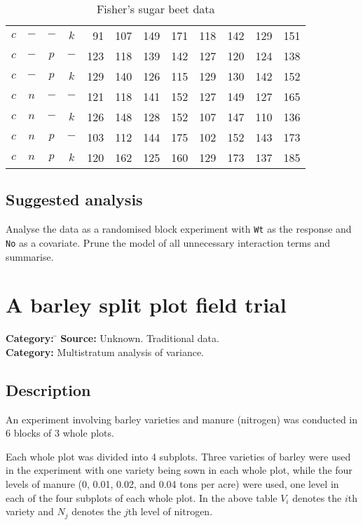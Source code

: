 \documentclass{article}
\newcommand{\strutt}{\vrule height 2.5ex depth 0.5ex width 0ex}%
\newcommand{\code}[1]{\texttt{#1}}
\begin{document}
\begin{table}[ht]
\begin{center}
\begin{tabular}{@{\protect\strutt}|cccc|*{4}{rr|}}
 $c$ &  $-$ &  $-$ &  $k$ &   91 & 107  &  149 & 171  &   118 & 142  &  129 & 151\\
 $c$ &  $-$ &  $p$ &  $-$ &  123 & 118  &  139 & 142  &   127 & 120  &  124 & 138\\
 $c$ &  $-$ &  $p$ &  $k$ &  129 & 140  &  126 & 115  &   129 & 130  &  142 & 152\\
 $c$ &  $n$ &  $-$ &  $-$ &  121 & 118  &  141 & 152  &   127 & 149  &  127 & 165\\
 $c$ &  $n$ &  $-$ &  $k$ &  126 & 148  &  128 & 152  &   107 & 147  &  110 & 136\\
 $c$ &  $n$ &  $p$ &  $-$ &  103 & 112  &  144 & 175  &   102 & 152  &  143 & 173\\
 $c$ &  $n$ &  $p$ &  $k$ &  120 & 162  &  125 & 160  &   129 & 173  &  137 & 185\\
\hline
\end{tabular}
\end{center}
\caption{\label{sugar}Fisher's sugar beet data}
\end{table}

\subsection*{Suggested analysis}
Analyse the data as a randomised block experiment with \code{Wt} as the
response and \code{No} as a covariate.  Prune the model of all unnecessary
interaction terms and summarise.


\clearpage\section{A barley split plot field trial}
\begin{tabbing}
\textbf{Category:} \= \kill
\textbf{Source:} \> Unknown.  Traditional data.\\
\textbf{Category:} \> Multistratum analysis of variance.
\end{tabbing}

\subsection*{Description}
An experiment involving barley varieties and manure (nitrogen) was conducted in 6
blocks of 3 whole plots.

Each whole plot was divided into 4 subplots.  Three varieties of barley were
used in the experiment with one variety being sown in each whole plot,
while the four levels of manure (0, 0.01, 0.02, and 0.04 tons per acre)
were used, one level in each of the four subplots of each whole plot.  In
the above table $V_i$ denotes the $i$th variety and $N_j$ denotes the $j$th
level of nitrogen.
\end{document}
